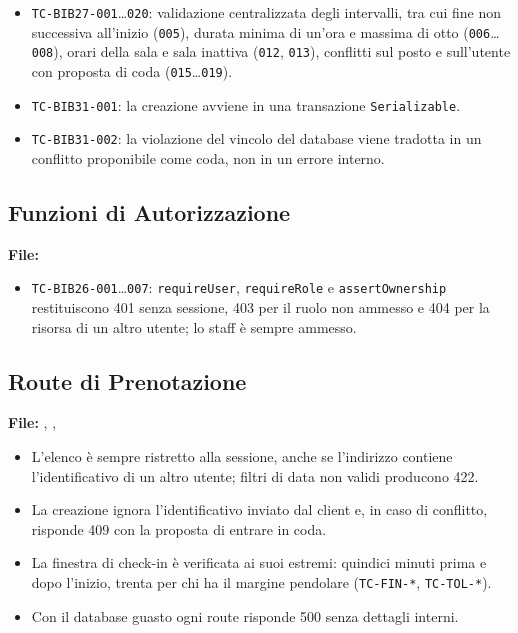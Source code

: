 \documentclass[11pt,a4paper,oneside,openany]{book}
\begin{document}
\begin{itemize}
  \item \texttt{TC-BIB27-001}\dots\texttt{020}: validazione centralizzata
        degli intervalli, tra cui fine non successiva all'inizio
        (\texttt{005}), durata minima di un'ora e massima di otto
        (\texttt{006}\dots\texttt{008}), orari della sala e sala inattiva
        (\texttt{012}, \texttt{013}), conflitti sul posto e sull'utente con
        proposta di coda (\texttt{015}\dots\texttt{019}).
  \item \texttt{TC-BIB31-001}: la creazione avviene in una transazione
        \texttt{Serializable}.
  \item \texttt{TC-BIB31-002}: la violazione del vincolo del database viene
        tradotta in un conflitto proponibile come coda, non in un errore
        interno.
\end{itemize}

\subsection{Funzioni di Autorizzazione}

\textbf{File:} 

\begin{itemize}
  \item \texttt{TC-BIB26-001}\dots\texttt{007}: \texttt{requireUser},
        \texttt{requireRole} e \texttt{assertOwnership} restituiscono 401
        senza sessione, 403 per il ruolo non ammesso e 404 per la risorsa di
        un altro utente; lo staff è sempre ammesso.
\end{itemize}

\subsection{Route di Prenotazione}

\textbf{File:} ,
,

\begin{itemize}
  \item L'elenco è sempre ristretto alla sessione, anche se l'indirizzo
        contiene l'identificativo di un altro utente; filtri di data non
        validi producono 422.
  \item La creazione ignora l'identificativo inviato dal client e, in caso
        di conflitto, risponde 409 con la proposta di entrare in coda.
  \item La finestra di check-in è verificata ai suoi estremi: quindici minuti
        prima e dopo l'inizio, trenta per chi ha il margine pendolare
        (\texttt{TC-FIN-*}, \texttt{TC-TOL-*}).
  \item Con il database guasto ogni route risponde 500 senza dettagli
        interni.
\end{itemize}
\end{document}
